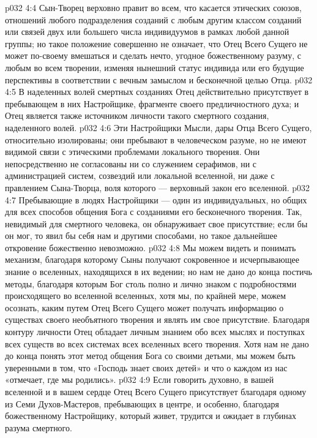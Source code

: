 \vs p032 4:4 Сын\hyp{}Творец верховно правит во всем, что касается этических союзов, отношений любого подразделения созданий с любым другим классом созданий или связей двух или большего числа индивидуумов в рамках любой данной группы; но такое положение совершенно не означает, что Отец Всего Сущего не может по\hyp{}своему вмешаться и сделать нечто, угодное божественному разуму, с любым   во всем творении, изменяя нынешний статус индивида или его будущие перспективы в соответствии с вечным замыслом и бесконечной целью Отца.
\vs p032 4:5 \pc В наделенных волей смертных созданиях Отец действительно присутствует в пребывающем в них Настройщике, фрагменте своего предличностного духа; и Отец является также источником личности такого смертного создания, наделенного волей.
\vs p032 4:6 \pc Эти Настройщики Мысли, дары Отца Всего Сущего, относительно изолированы; они пребывают в человеческом разуме, но не имеют видимой связи с этическими проблемами локального творения. Они непосредственно не согласованы ни со служением серафимов, ни с администрацией систем, созвездий или локальной вселенной, ни даже с правлением Сына\hyp{}Творца, воля которого --- верховный закон его вселенной.
\vs p032 4:7 Пребывающие в людях Настройщики --- один из индивидуальных, но общих для всех способов общения Бога с созданиями его бесконечного творения. Так, невидимый для смертного человека, он обнаруживает свое присутствие; если бы он мог, то явил бы себя нам и другими способами, но такое дальнейшее откровение божественно невозможно.
\vs p032 4:8 Мы можем видеть и понимать механизм, благодаря которому Сыны получают сокровенное и исчерпывающее знание о вселенных, находящихся в их ведении; но нам не дано до конца постичь методы, благодаря которым Бог столь полно и лично знаком с подробностями происходящего во вселенной вселенных, хотя мы, по крайней мере, можем осознать, каким путем Отец Всего Сущего может получать информацию о существах своего необъятного творения и являть им свое присутствие. Благодаря контуру личности Отец обладает личным знанием обо всех мыслях и поступках всех существ во всех системах всех вселенных всего творения. Хотя нам не дано до конца понять этот метод общения Бога со своими детьми, мы можем быть уверенными в том, что «Господь знает своих детей» и что о каждом из нас «отмечает, где мы родились».
\vs p032 4:9 \pc Если говорить духовно, в вашей вселенной и в вашем сердце Отец Всего Сущего присутствует благодаря одному из Семи Духов\hyp{}Мастеров, пребывающих в центре, и особенно, благодаря божественному Настройщику, который живет, трудится и ожидает в глубинах разума смертного.
